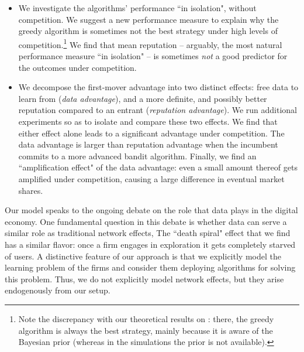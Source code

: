 \begin{itemize}
\item We investigate the algorithms' performance ``in isolation", \ie without competition. We suggest a new performance measure to explain why the greedy algorithm is sometimes not the best strategy under high levels of competition.\footnote{Note the discrepancy with our theoretical results on \HardMax: there, the greedy algorithm is always the best strategy, mainly because it is aware of the Bayesian prior (whereas in the simulations the prior is not available).}
     We find that mean reputation -- arguably, the most natural performance measure ``in isolation" -- is sometimes \emph{not} a good predictor for the outcomes under competition.

\item We decompose the first-mover advantage into two distinct effects: free data to learn from (\emph{data advantage}), and a more definite, and possibly better reputation compared to an entrant (\emph{reputation advantage}). We run additional experiments so as to isolate and compare these two effects. We find that either effect alone leads to a significant advantage under competition. The data advantage is larger than reputation advantage when the incumbent commits to a more advanced bandit algorithm. Finally, we find an ``amplification effect" of the data advantage: even a small amount thereof gets amplified under competition, causing a large difference in eventual market shares.

\end{itemize}



Our model speaks to the ongoing debate on the role that data plays in the digital economy. One fundamental question in this debate is whether data can serve a similar role as traditional network effects, 
The ``death spiral" effect that we find has a similar flavor: 
once a firm engages in exploration it gets completely starved of users.  A distinctive feature of our approach is that we explicitly model the learning problem of the firms and consider them deploying algorithms for solving this problem.  Thus, we do not explicitly model  network effects, but they arise endogenously from our setup.

